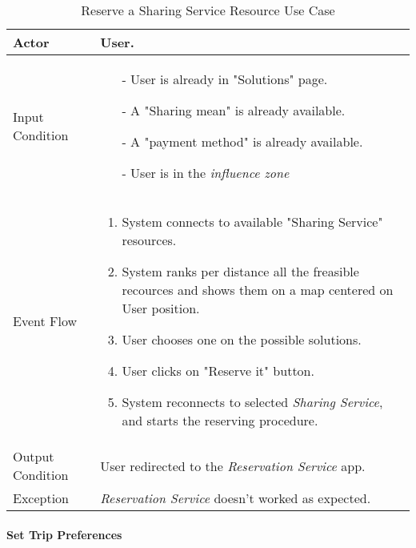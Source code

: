 		\begin{table}[H]
			\begin{tabular}{| l | p{} | }
				\hline
				\hline
				Actor	&		User. \\
				\hline
				Input Condition		&		\begin{itemize}
														\item[-] User is already in "Solutions" page.
														\item[-] A "Sharing mean" is already available.
														\item[-] A "payment method" is already available.
														\item[-] User is in the \textit{influence zone}
													\end{itemize} \\
				\hline
				Event Flow		&		\begin{enumerate}
													\item System connects to available "Sharing Service" resources.
													\item System ranks per distance all the freasible recources and shows them on a map centered on User position.
													\item User chooses one on the possible solutions.												
													\item User clicks on "Reserve it" button.
													\item	 System reconnects to selected \textit{Sharing Service}, and starts the reserving procedure.
												\end{enumerate} \\
				\hline
				Output Condition		&		User redirected to the \textit{Reservation Service} app. \\
				\hline		
				Exception		&		\textit{Reservation Service} doesn't worked as expected. \\
				\hline
				\hline
			\end{tabular}
			\caption{Reserve a Sharing Service Resource Use Case}
		\end{table}
		

	\paragraph{Set Trip Preferences}
	
